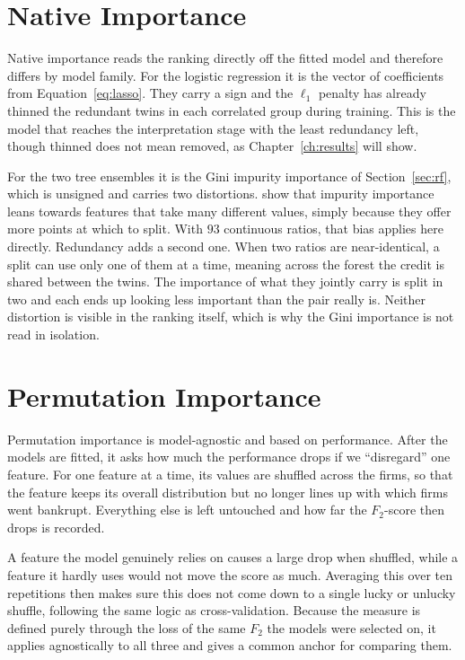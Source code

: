\section{Native Importance}
\label{sec:fi-native}

Native importance reads the ranking directly off the fitted model and therefore
differs by model family. For the logistic regression it is the vector of coefficients from
Equation~\eqref{eq:lasso}. They carry a sign and the $\ell_1$ penalty has
already thinned the redundant twins in each correlated group during training.
This is the model that reaches the interpretation stage with the least
redundancy left, though thinned does not mean removed, as
Chapter~\ref{ch:results} will show.

For the two tree ensembles it is the Gini impurity importance of
Section~\ref{sec:rf}, which is unsigned and carries two distortions. 
\textcite{strobl2007} show that impurity importance leans towards features that take
many different values, simply because they offer more points at which to split. With
$93$ continuous ratios, that bias applies here directly. 
Redundancy adds a second one. When two ratios are near-identical, a split can use
only one of them at a time, meaning across the forest the credit is shared between the
twins. The importance of what they jointly carry is split in two and each ends up
looking less important than the pair really is. Neither distortion is visible in 
the ranking itself, which is why the Gini importance is not read in isolation.

\section{Permutation Importance}
\label{sec:fi-permutation}

Permutation importance is model-agnostic and based on performance. After the models
are fitted, it asks how much the performance drops if we ``disregard'' one feature.
For one feature at a time, its values are shuffled across the firms, so that the
feature keeps its overall distribution but no longer lines up with which firms went
bankrupt. Everything else is left untouched and how far the $F_2$-score then drops
is recorded.

A feature the model genuinely relies on causes a large drop when shuffled, while a
feature it hardly uses would not move the score as much. Averaging this over ten repetitions then
makes sure this does not come down to a single lucky or unlucky shuffle,
following the same logic as cross-validation. Because the measure is defined
purely through the loss of the same $F_2$ the models were selected on, it applies
agnostically to all three and gives a common anchor for comparing them.

